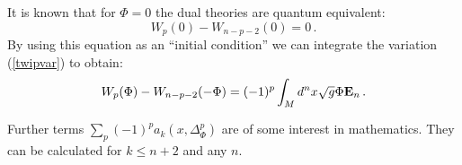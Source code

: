 It is known \cite{Fradkin:1985ai,Barbon:1995zh} that for $\Phi =0$
the dual theories are quantum equivalent:
\begin{equation}
W_p(0)-W_{n-p-2}(0)=0 \,.\label{Phi0}
\end{equation}
By using this equation as an ``initial condition'' we can integrate
the variation (\ref{twipvar}) to obtain:
\begin{equation}
W_p(\Phi )-W_{n-p-2}(-\Phi )=(-1)^p \int_M d^nx\sqrt{g} \Phi {\rm \bf E}_n \,.\label{Phidual}
\end{equation}

Further terms $\sum_p (-1)^p a_k (x,\Delta_\Phi^p)$ are of some
interest in mathematics. They can be calculated 
\cite{Gilkey:2002hk,Gilkey:2002ts} for 
$k\le n+2$ and any $n$.


